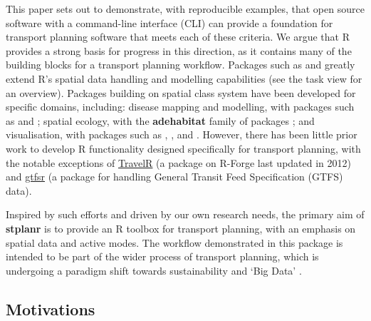 This paper sets out to demonstrate, with reproducible examples, that open source software with a command-line interface (CLI) can provide a foundation for transport planning software that meets
each of these criteria.
We argue that R provides a strong basis for progress in this direction, as it contains many of the building blocks for a transport planning workflow.
Packages such as 
\citep{pebesma_classes_2005} and 
\citep{bivand_rgeos:_2016} greatly extend R's spatial data handling and
modelling capabilities \citep{bivand_applied_2013}
(see the  task view for an overview).
Packages building on
spatial class system have been developed for specific domains,
including: disease mapping and modelling, with packages such as  and  \citep{kim_spatialepi:_2016,brown_diseasemapping:_2016}; spatial ecology, with the \textbf{adehabitat} family of packages \citep{calenge_package_2006};
and visualisation, with packages such as , ,  and  \citep{RJ-2016-005}.
However, there has been little prior work to develop R functionality designed
specifically for transport planning, with the notable exceptions of
\href{http://r-forge.r-project.org/projects/travelr/}{TravelR} (a package on R-Forge last updated in 2012)
and \href{https://github.com/ropensci/gtfsr}{gtfsr}
(a package for handling  General Transit Feed Specification (GTFS) data).

Inspired by such efforts and driven by our own research needs, the
primary aim of \textbf{stplanr} is to provide an R toolbox for transport planning, with an emphasis on spatial data and active modes.
The workflow demonstrated in this package is intended to be part of the wider process of transport planning, which is undergoing a paradigm shift towards sustainability \citep{banister_sustainable_2008} and `Big Data' \citep{zheng_big_2016}.

\subsection{Motivations}\label{motivations}

